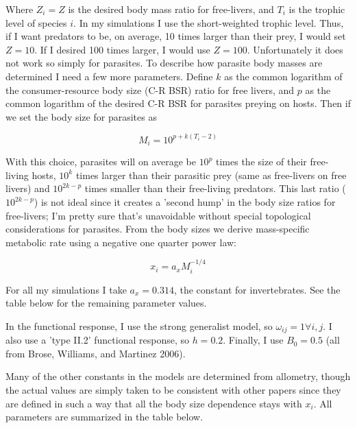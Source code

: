 \documentclass[11pt]{amsart}
\begin{document}
Where $Z_i=Z$ is the desired body mass ratio for free-livers, and $T_{i}$ is the trophic level of species $i$.  In my simulations I use the short-weighted trophic level.  Thus, if I want predators to be, on average, 10 times larger than their prey, I would set $Z = 10$.  If I desired 100 times larger, I would use $Z=100$.  Unfortunately it does not work so simply for parasites.  To describe how parasite body masses are determined I need a few more parameters. Define $k$ as the common logarithm of the consumer-resource body size (C-R BSR) ratio for free livers, and $p$ as the common logarithm of the desired  C-R BSR for parasites preying on hosts.  Then if we set the body size for parasites as 

\begin{equation}
M_i = 10^{p + k(T_i -2)} \label{MP}
\end{equation}

With this choice, parasites will on average be $10^{p}$ times the size of their free-living hosts, $10^k$ times larger than their parasitic prey (same as free-livers on free livers) and $10^{2k-p}$ times smaller than their free-living predators.  This last ratio ($10^{2k-p}$) is not ideal since it creates a 'second hump' in the body size ratios for free-livers; I'm pretty sure that's unavoidable without special topological considerations for parasites.  From the body sizes we derive mass-specific metabolic rate using a negative one quarter power law:

\begin{equation}
x_i = a_xM_i^{-1/4}\label{xeq}
\end{equation}

For all my simulations I take $a_x = 0.314$, the constant for invertebrates.  See the table below for the remaining parameter values.

In the functional response, I use the strong generalist model, so $\omega_{ij} = 1 \forall i,j$.  I also use a 'type II.2' functional response, so $h = 0.2$.  Finally, I use $B_0 = 0.5$ (all from Brose, Williams, and Martinez 2006).

Many of the other constants in the models are determined from allometry, though the actual values are simply taken to be consistent with other papers since they are defined in such a way that all the body size dependence stays with $x_i$.  All parameters are summarized in the table below.
\end{document}
